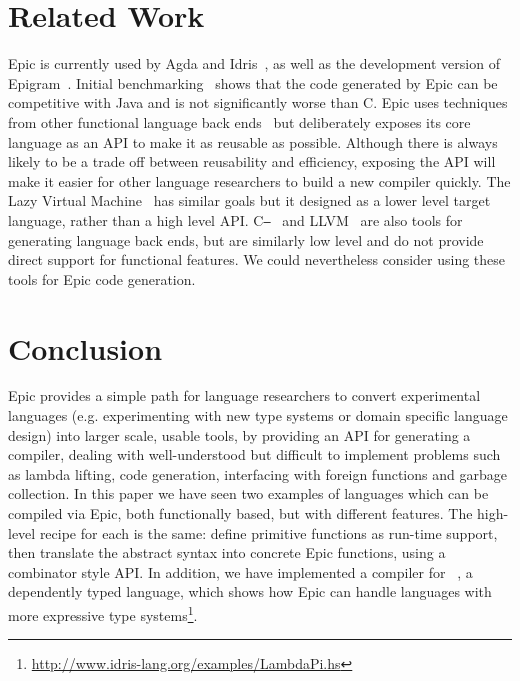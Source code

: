 \section{Related Work}


Epic is currently used by Agda and Idris~\cite{plpv11}, as well as the
development version of Epigram~\cite{levitation}. Initial
benchmarking~\cite{scrap-engine} shows that the code generated by Epic
can be competitive with Java and is not significantly worse than C.
Epic uses techniques from other functional language back
ends~\cite{evalpush,stg,abc-machine} but deliberately exposes its core
language as an API to make it as reusable as possible. Although there
is always likely to be a trade off between reusability and efficiency,
exposing the API will make it easier for other language researchers to
build a new compiler quickly. The Lazy Virtual Machine~\cite{lvm} has
similar goals but it designed as a lower level target language, rather
than a high level API. C\texttt{--}~\cite{c--} and LLVM~\cite{llvm} are also
tools for generating language back ends, but are similarly low level and
do not provide direct support for functional features. We could
nevertheless consider using these tools for Epic code generation.


\section{Conclusion}

Epic provides a simple path for language researchers to convert
experimental languages (e.g. experimenting with new type systems or
domain specific language design) into larger scale, usable tools, by
providing an API for generating a compiler, dealing with
well-understood but difficult to implement problems such as lambda
lifting, code generation, interfacing with foreign functions and
garbage collection. 
In this paper we have seen two examples of languages which can be
compiled via Epic, both functionally based, but with different
features. The high-level recipe for each is the same: define primitive
functions as run-time support, then translate the abstract syntax into
concrete Epic functions, using a combinator style API.  In addition,
we have implemented a compiler for \LamPi{}~\cite{simply-easy}, a
dependently typed language, which shows how Epic can handle languages
with more expressive type
systems\footnote{\url{http://www.idris-lang.org/examples/LambdaPi.hs}}.


